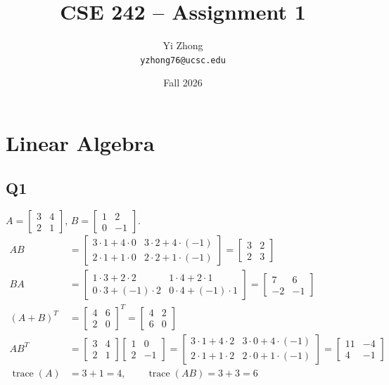 \documentclass[11pt]{article}
\title{CSE 242 -- Assignment 1}
\author{Yi Zhong \\ \texttt{yzhong76@ucsc.edu}}
\date{Fall 2026}
\DeclareMathOperator{\tr}{trace}
\newcommand{\mat}[1]{\begin{bmatrix}#1\end{bmatrix}}
\begin{document}
\maketitle

\section{Linear Algebra}

\subsection{Q1}
$A=\mat{3&4\\2&1}$, $B=\mat{1&2\\0&-1}$.
\begin{align*}
AB &= \mat{3\cdot1+4\cdot0 & 3\cdot2+4\cdot(-1)\\ 2\cdot1+1\cdot0 & 2\cdot2+1\cdot(-1)}
    = \mat{3&2\\2&3}\\[4pt]
BA &= \mat{1\cdot3+2\cdot2 & 1\cdot4+2\cdot1\\ 0\cdot3+(-1)\cdot2 & 0\cdot4+(-1)\cdot1}
    = \mat{7&6\\-2&-1}\\[4pt]
(A+B)^T &= \mat{4&6\\2&0}^T = \mat{4&2\\6&0}\\[4pt]
AB^T &= \mat{3&4\\2&1}\mat{1&0\\2&-1}
     = \mat{3\cdot1+4\cdot2 & 3\cdot0+4\cdot(-1)\\ 2\cdot1+1\cdot2 & 2\cdot0+1\cdot(-1)}
     = \mat{11&-4\\4&-1}\\[4pt]
\tr(A) &= 3+1 = 4,\qquad
\tr(AB) = 3+3 = 6
\end{align*}
\end{document}
